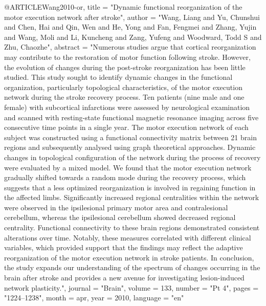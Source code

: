 @ARTICLE{Wang2010-or,
	title    = "Dynamic functional reorganization of the motor execution network
	after stroke",
	author   = "Wang, Liang and Yu, Chunshui and Chen, Hai and Qin, Wen and He,
	Yong and Fan, Fengmei and Zhang, Yujin and Wang, Moli and Li,
	Kuncheng and Zang, Yufeng and Woodward, Todd S and Zhu, Chaozhe",
	abstract = "Numerous studies argue that cortical reorganization may
	contribute to the restoration of motor function following stroke.
	However, the evolution of changes during the post-stroke
	reorganization has been little studied. This study sought to
	identify dynamic changes in the functional organization,
	particularly topological characteristics, of the motor execution
	network during the stroke recovery process. Ten patients (nine
	male and one female) with subcortical infarctions were assessed
	by neurological examination and scanned with resting-state
	functional magnetic resonance imaging across five consecutive
	time points in a single year. The motor execution network of each
	subject was constructed using a functional connectivity matrix
	between 21 brain regions and subsequently analysed using graph
	theoretical approaches. Dynamic changes in topological
	configuration of the network during the process of recovery were
	evaluated by a mixed model. We found that the motor execution
	network gradually shifted towards a random mode during the
	recovery process, which suggests that a less optimized
	reorganization is involved in regaining function in the affected
	limbs. Significantly increased regional centralities within the
	network were observed in the ipsilesional primary motor area and
	contralesional cerebellum, whereas the ipsilesional cerebellum
	showed decreased regional centrality. Functional connectivity to
	these brain regions demonstrated consistent alterations over
	time. Notably, these measures correlated with different clinical
	variables, which provided support that the findings may reflect
	the adaptive reorganization of the motor execution network in
	stroke patients. In conclusion, the study expands our
	understanding of the spectrum of changes occurring in the brain
	after stroke and provides a new avenue for investigating
	lesion-induced network plasticity.",
	journal  = "Brain",
	volume   =  133,
	number   = "Pt 4",
	pages    = "1224--1238",
	month    =  apr,
	year     =  2010,
	language = "en"
}

